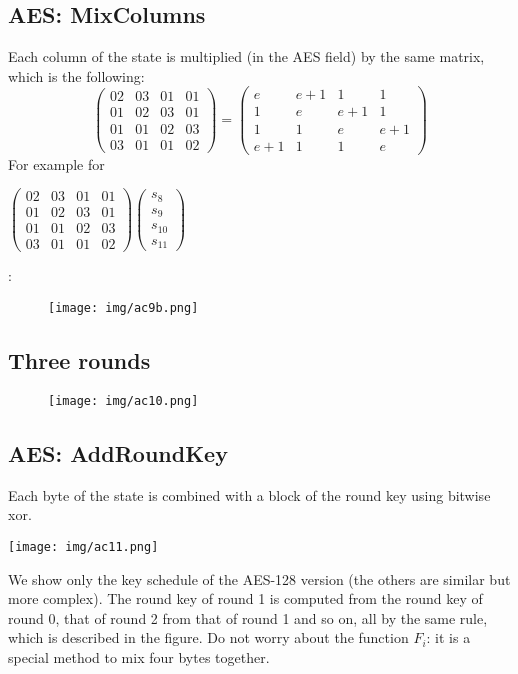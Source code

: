 \documentclass[a4paper, 10pt, titlepage]{article}
\begin{document}
\subsection{AES: MixColumns}
Each column of the state is multiplied (in the AES field) by the same
matrix, which is the following: 
$$ \left(
\begin{matrix}
02 & 03 & 01 & 01 \\
01 & 02 & 03 & 01 \\
01 & 01 & 02 & 03 \\
03 & 01 & 01 & 02 
\end{matrix} \right) = \left(
\begin{matrix}
e & e+1 & 1 & 1 \\
1 & e & e+1 & 1 \\
1 & 1 & e & e+1 \\
e+1 & 1 & 1 & e 
\end{matrix} \right)
$$
For example for \begin{footnotesize}
$\left(\begin{matrix}
02 & 03 & 01 & 01 \\
01 & 02 & 03 & 01 \\
01 & 01 & 02 & 03 \\
03 & 01 & 01 & 02 
\end{matrix}\right) \left( \begin{matrix}
s_8 \\
s_9 \\
s_{10} \\
s_{11} 
\end{matrix} \right)$
\end{footnotesize}:
\begin{figure}[h]
\centering
\texttt{[image: img/ac9b.png]}
\end{figure}
\subsection*{Three rounds}
\begin{figure}[h]
\centering
\texttt{[image: img/ac10.png]}
\end{figure}

\subsection{AES: AddRoundKey}
Each byte of the state is combined with a block of the round key using bitwise xor.
\begin{center}
\centering \texttt{[image: img/ac11.png]}
\end{center}
We show only the key schedule of the AES-128 version (the others are similar but more complex).  The round key of round 1 is computed from the round key of round 0, that of round 2 from that of round 1   and so on, all by the same rule, which is described in the figure. Do not worry about the function $F_i$: it is a special method to mix four bytes together.
\end{document}
